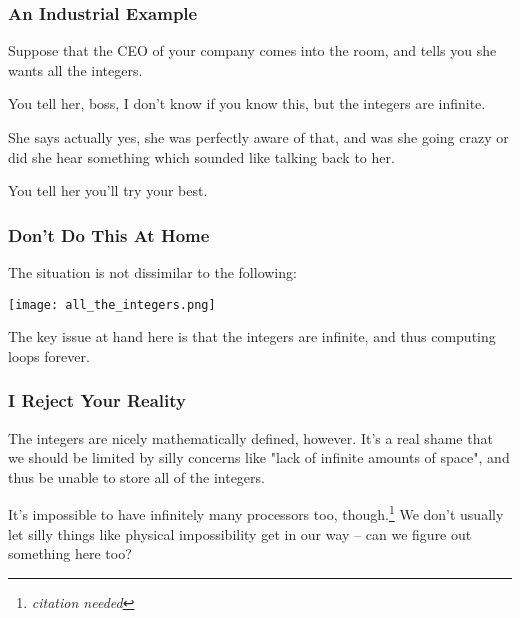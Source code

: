 \documentclass[aspectratio=169, handout]{beamer}
\begin{document}


\begin{frame}[fragile]
  \frametitle{An Industrial Example}

  Suppose that the CEO of your company comes into the room, and tells you she
  wants all the integers.

  \pause
  \vspace{\fill}

  You tell her, boss, I don't know if you know this, but the integers are infinite.

  \pause
  \vspace{\fill}

  She says actually yes, she was perfectly aware of that, and was she going crazy
  or did she hear something which sounded like talking back to her.

  \pause
  \vspace{\fill}

  You tell her you'll try your best.
\end{frame}

\begin{frame}[fragile]
  \frametitle{Don't Do This At Home}

  The situation is not dissimilar to the following:

  \pause
  \vspace{\fill}

  \begin{center}
  \texttt{[image: all\_the\_integers.png]}
  \end{center}

  \pause
  \vspace{\fill}

  The key issue at hand here is that the integers are infinite, and thus
  computing  loops forever.
\end{frame}

\begin{frame}[fragile]
  \frametitle{I Reject Your Reality}

  The integers are nicely mathematically defined, however. It's a real shame
  that we should be limited by silly concerns like "lack of infinite amounts
  of space", and thus be unable to store all of the integers.

  \pause
  \vspace{\fill}

  It's impossible to have infinitely many processors too, though.\footnote{\textit{citation needed}}
  We don't usually let silly things like physical impossibility get in our way --
  can we figure out something here too?
\end{frame}
\end{document}
